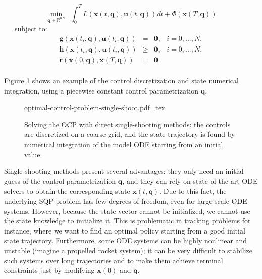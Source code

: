 \begin{equation}
  \min_{\mathbf{q}\in\mathbb R^{nN}} \ \ \int_{0}^{T}L (\mathbf{x}(t,\mathbf{q}),
  \mathbf{u}(t,\mathbf{q}))dt + \Phi(\mathbf{x}(T,\mathbf{q}))
\end{equation}
\ \ \ subject to:
\begin{equation}
  \begin{array}{rclr}
  \mathbf{g}(\mathbf{x}(t_i,\mathbf{q}), \mathbf{u}(t_i,\mathbf{q})) & = & \mathbf{0}, & i=0,\ldots,N,%
  \\%
  \mathbf{h}(\mathbf{x}(t_i,\mathbf{q}), \mathbf{u}(t_i,\mathbf{q})) & \ge & \mathbf{0}, & i=0,\ldots,N,%
  \\%
  \mathbf{r} (\mathbf{x}(0,\mathbf{q}), \mathbf{x}(T,\mathbf{q})) & = & \mathbf{0}.%
  \\%
  \end{array}
\end{equation} 

Figure \ref{fig:chap3-optimal-control-problem-single-shoot} shows an
example of the control discretization and state numerical integration,
using a piecewise constant control parametrization $\mathbf{q}$.

\begin{figure}
  \centering
      {\def\svgwidth{0.9\linewidth}
        
                   {optimal-control-problem-single-shoot.pdf_tex}
      }
      \caption{Solving the OCP with direct single-shooting methods:
        the controls are discretized on a coarse grid, and the state
        trajectory is found by numerical integration of the model ODE
        starting from an initial value.}
      \label{fig:chap3-optimal-control-problem-single-shoot}
\end{figure}

Single-shooting methods present several advantages: they only need an
initial guess of the control parametrization $\mathbf{q}$, and they
can rely on state-of-the-art ODE solvers to obtain the corresponding
state $\mathbf{x}(t,\mathbf{q})$. Due to this fact, the underlying SQP
problem has few degrees of freedom, even for large-scale ODE
systems. However, because the state vector cannot be initialized, we
cannot use the state knowledge to initialize it. This is problematic
in tracking problems for instance, where we want to find an optimal
policy starting from a good initial state trajectory. Furthermore,
some ODE systems can be highly nonlinear and unstable (imagine a
propelled rocket system); it can be very difficult to stabilize such
systems over long trajectories and to make them achieve terminal
constraints just by modifying $\mathbf{x}(0)$ and $\mathbf{q}$.

